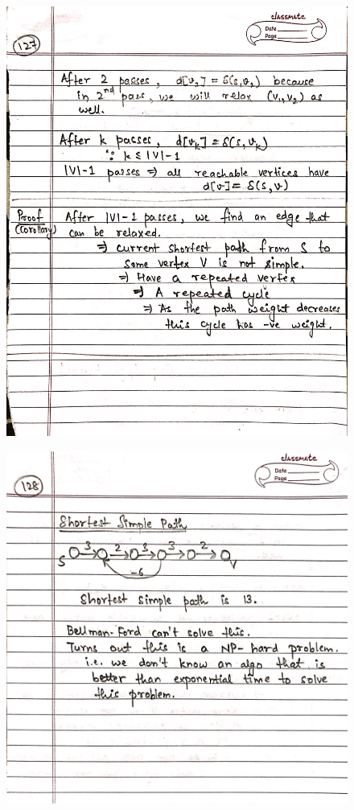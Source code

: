 \begin{figure}[H]
    \centering
    \includegraphics[scale=0.25]{"./MIT 6.006/MIT_6006_127"}
\end{figure}
\newpage
\begin{figure}[H]
    \centering
    \includegraphics[scale=0.25]{"./MIT 6.006/MIT_6006_128"}
\end{figure}
